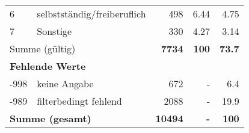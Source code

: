 \begin{longtable}{lXrrr}
     6 &
     \multicolumn{1}{X}{ selbstständig/freiberuflich   } &


       \num{498} &
       \num[round-mode=places,round-precision=2]{6,44} &
         \num[round-mode=places,round-precision=2]{4,75} \\

     7 &
     \multicolumn{1}{X}{ Sonstige   } &


       \num{330} &
       \num[round-mode=places,round-precision=2]{4,27} &
         \num[round-mode=places,round-precision=2]{3,14} \\
     \midrule
     \multicolumn{2}{l}{Summe (gültig)} &
       \textbf{\num{7734}} &
     \textbf{100} &
       \textbf{\num[round-mode=places,round-precision=2]{73,7}} \\
     \multicolumn{5}{l}{\textbf{Fehlende Werte}}\\
       -998 &
       keine Angabe &
         \num{672} &
        - &
         \num[round-mode=places,round-precision=2]{6,4} \\
       -989 &
       filterbedingt fehlend &
         \num{2088} &
        - &
         \num[round-mode=places,round-precision=2]{19,9} \\
     \midrule
     \multicolumn{2}{l}{\textbf{Summe (gesamt)}} &
          \textbf{\num{10494}} &
        \textbf{-} &
        \textbf{100} \\
     \bottomrule
     \end{longtable}
     
